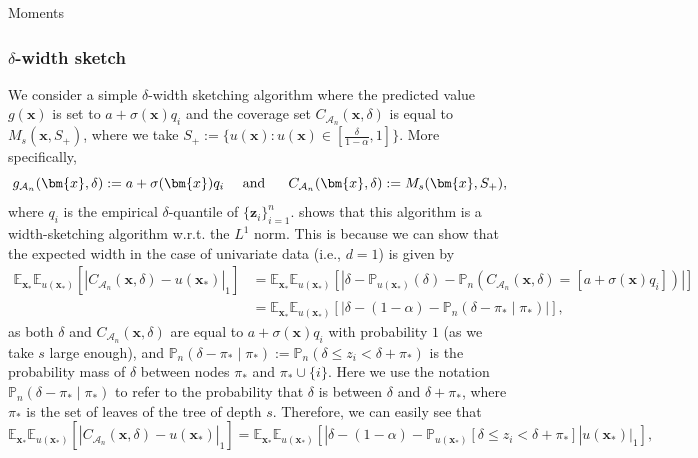 \begin{assumptioni}[i.i.d data]
\begin{assumptioni}
\begin{assumptioni}{Moments}
\subsubsection{$\delta$-width sketch}
We consider a simple $\delta$-width sketching algorithm where the predicted value $g(\bm{x})$ is set to $a + \sigma(\bm{x}) q_i$ and the coverage set $C_{\mathcal{A}_n}(\bm{x},\delta)$ is equal to $M_s(\bm{x}, S_+)$, 
where we take $S_+ := \{ u(\bm{x}) : u(\bm{x}) \in [\frac{\delta}{1 - \alpha},1] \}$.
More specifically,
\begin{equation} 
  g_{\mathcal{A}_n}(\bm{x},\delta) := a + \sigma(\bm{x}) q_i  ~~~ \text{\normalfont{ and }} ~~~~ C_{\mathcal{A}_n}(\bm{x},\delta) := M_s(\bm{x},S_+),
\end{equation}
where $q_i$ is the empirical $\delta$-quantile of $\{ \bm z_i \}_{i=1}^{n}$.
 shows that this algorithm is a width-sketching algorithm w.r.t. the $L^1$ norm.
This is because we can show that the expected width in the case of univariate data (i.e., $d=1$) is given by
\begin{equation} \label{eq:width_bias}
\begin{split}
  \mathbb{E}_{\bm{x}_*} \mathbb{E}_{u(\bm{x_*})}[|C_{\mathcal{A}_n}(\bm{x},\delta) - u(\bm{x_*})|_1] &= \mathbb{E}_{\bm{x}_*} \mathbb{E}_{u(\bm{x_*})}[|\delta - \mathbb{P}_{u(\bm{x_*})}(\delta) - \mathbb{P}_n(C_{\mathcal{A}_n}(\bm{x},\delta) = [a + \sigma(\bm{x}) q_i])|]  \\
  &= \mathbb{E}_{\bm{x}_*} \mathbb{E}_{u(\bm{x_*})}[|\delta - (1 - \alpha) - \mathbb{P}_n(\delta - \pi_* \mid \pi_*)|],
\end{split}
\end{equation}
as both $\delta$ and $C_{\mathcal{A}_n}(\bm{x},\delta)$ are equal to $a + \sigma(\bm{x}) q_i$ with probability $1$ (as we take $s$ large enough), and $\mathbb{P}_n(\delta - \pi_* \mid \pi_*) := \mathbb{P}_n(\delta \leq z_i < \delta + \pi_*)$ is the probability mass of $\delta$ between nodes $\pi_*$ and $\pi_* \cup \{i\}$. 
Here we use the notation $\mathbb{P}_n(\delta - \pi_* \mid \pi_*)$ to refer to the probability that $\delta$ is between $\delta$ and $\delta + \pi_*$, where $\pi_*$ is the set of leaves of the tree of depth $s$.
Therefore, we can easily see that 
\begin{equation}
  \mathbb{E}_{\bm{x}_*} \mathbb{E}_{u(\bm{x_*})}[|C_{\mathcal{A}_n}(\bm{x},\delta) - u(\bm{x_*})|_1] = \mathbb{E}_{\bm{x}_*} \mathbb{E}_{u(\bm{x_*})}[|\delta - (1 - \alpha) - \mathbb{P}_{u(\bm{x_*})}[ \delta \leq z_i < \delta + \pi_*] |u(\bm{x_*})|_1],

\end{equation}
\end{assumptioni}
\end{assumptioni}
\end{assumptioni}

